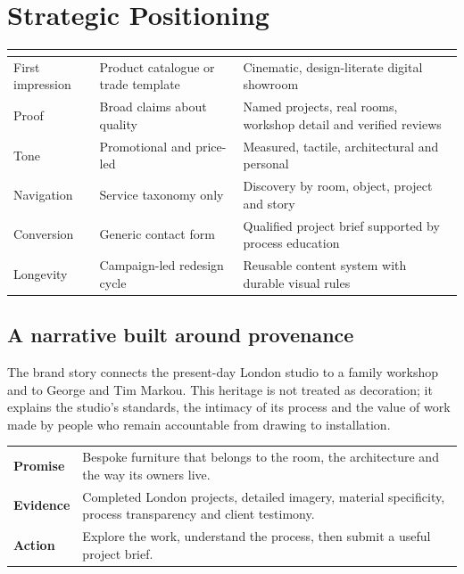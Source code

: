 \documentclass[10.5pt,a4paper]{article}
\newcommand{\eyebrow}[1]{%
  {\fontsize{7.8}{10}\selectfont\bfseries\color{MarkouStone}\textls[180]{\MakeUppercase{#1}}}%
}
\begin{document}
\section{Strategic Positioning}
\begin{tabularx}{\textwidth}{p{34mm} X X}
\toprule
\eyebrow{Dimension} & \eyebrow{Conventional approach} & \eyebrow{Markou direction}\\
\midrule
First impression & Product catalogue or trade template &
Cinematic, design-literate digital showroom\\
Proof & Broad claims about quality &
Named projects, real rooms, workshop detail and verified reviews\\
Tone & Promotional and price-led &
Measured, tactile, architectural and personal\\
Navigation & Service taxonomy only &
Discovery by room, object, project and story\\
Conversion & Generic contact form &
Qualified project brief supported by process education\\
Longevity & Campaign-led redesign cycle &
Reusable content system with durable visual rules\\
\bottomrule
\end{tabularx}

\subsection{A narrative built around provenance}
The brand story connects the present-day London studio to a family workshop and
to George and Tim Markou. This heritage is not treated as decoration; it
explains the studio's standards, the intimacy of its process and the value of
work made by people who remain accountable from drawing to installation.

\begin{insightbox}
\eyebrow{Core message architecture}\par\vspace{3mm}
\begin{tabularx}{\textwidth}{>{\bfseries}p{31mm} X}
Promise & Bespoke furniture that belongs to the room, the architecture and the
way its owners live.\\
Evidence & Completed London projects, detailed imagery, material specificity,
process transparency and client testimony.\\
Action & Explore the work, understand the process, then submit a useful project
brief.\\
\end{tabularx}
\end{insightbox}
\end{document}

